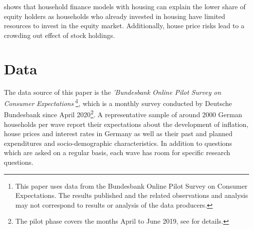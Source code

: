 \documentclass[ProjectABM]{subfiles}
\begin{document}
\cite{cocco2005housing} shows that household finance models with housing can explain the lower share of equity holders as households who already invested in housing have limited resources to invest in the equity market. Additionally, house price risks lead to a crowding out effect of stock holdings.







\section{Data}\label{sec:data}

The data source of this paper is the \textit{'Bundesbank Online Pilot Survey on Consumer Expectations'}\footnote{This paper uses data from the Bundesbank Online Pilot Survey on Consumer Expectations. The results published and the related observations and analysis may not correspond to results or analysis of the data producers.}, which is a monthly survey conducted by Deutsche Bundesbank since April 2020\footnote{The pilot phase covers the months April to June 2019, see \cite{bundesbank_2020} for details.}. A representative sample of around 2000 German households per wave report their expectations about the development of inflation, house prices and interest rates in Germany as well as their past and planned expenditures and socio-demographic characteristics. In addition to questions which are asked on a regular basis, each wave has room for specific research questions.
\end{document}
